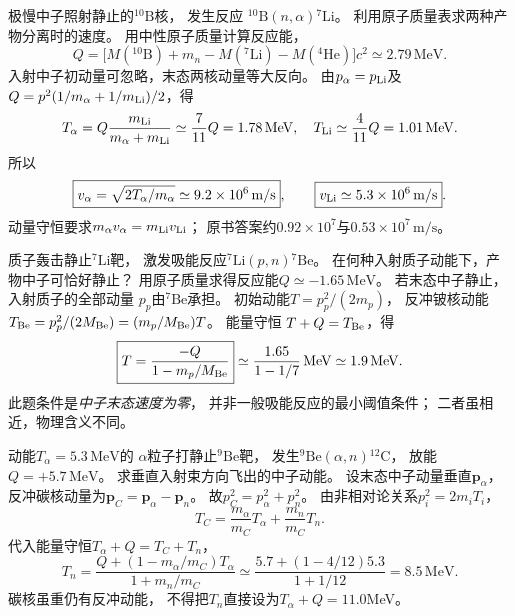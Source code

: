 极慢中子照射静止的$^{10}\mathrm B$核，
发生反应
$^{10}\mathrm B(n,\alpha){}^{7}\mathrm{Li}$。
利用原子质量表求两种产物分离时的速度。
\exsolution
用中性原子质量计算反应能，
\[
 Q=\bigl[M(^{10}\mathrm B)+m_n-
 M(^{7}\mathrm{Li})-M(^{4}\mathrm{He})\bigr]c^2
 \simeq2.79\,\mathrm{MeV}.
\]
入射中子初动量可忽略，末态两核动量等大反向。
由$p_\alpha=p_{\rm Li}$及
$Q=p^2(1/m_\alpha+1/m_{\rm Li})/2$，得
\[
 T_\alpha=Q\frac{m_{\rm Li}}{m_\alpha+m_{\rm Li}}
 \simeq\frac7{11}Q=1.78\,\mathrm{MeV},\quad
 T_{\rm Li}\simeq\frac4{11}Q=1.01\,\mathrm{MeV}.
\]
所以
\[
 \boxed{v_\alpha=\sqrt{2T_\alpha/m_\alpha}
 \simeq9.2\times10^6\,\mathrm{m/s}},\qquad
 \boxed{v_{\rm Li}\simeq5.3\times10^6\,\mathrm{m/s}}.
\]
\excheck 动量守恒要求$m_\alpha v_\alpha=m_{\rm Li}v_{\rm Li}$；
原书答案约$0.92\times10^7$与$0.53\times10^7\,\mathrm{m/s}$。

质子轰击静止$^{7}\mathrm{Li}$靶，
激发吸能反应$^{7}\mathrm{Li}(p,n){}^{7}\mathrm{Be}$。
在何种入射质子动能下，产物中子可恰好静止？
\exsolution
用原子质量求得反应能$Q\simeq-1.65\,\mathrm{MeV}$。
若末态中子静止，入射质子的全部动量
$p_p$由$^{7}\mathrm{Be}$承担。
初始动能$T=p_p^2/(2m_p)$，
反冲铍核动能$T_{\rm Be}=p_p^2/(2M_{\rm Be})
=(m_p/M_{\rm Be})T$。
能量守恒
$T+Q=T_{\rm Be}$，得
\[
 \boxed{T=\frac{-Q}{1-m_p/M_{\rm Be}}}
 \simeq\frac{1.65}{1-1/7}\,\mathrm{MeV}
 \simeq1.9\,\mathrm{MeV}.
\]
\excheck 此题条件是\emph{中子末态速度为零}，
并非一般吸能反应的最小阈值条件；
二者虽相近，物理含义不同。

动能$T_\alpha=5.3\,\mathrm{MeV}$的
$\alpha$粒子打静止$^{9}\mathrm{Be}$靶，
发生$^{9}\mathrm{Be}(\alpha,n){}^{12}\mathrm C$，
放能$Q=+5.7\,\mathrm{MeV}$。
求垂直入射束方向飞出的中子动能。
\exsolution
设末态中子动量垂直$\boldsymbol p_\alpha$，
反冲碳核动量为$\boldsymbol p_C=\boldsymbol p_\alpha-\boldsymbol p_n$。
故$p_C^2=p_\alpha^2+p_n^2$。
由非相对论关系$p_i^2=2m_iT_i$，
\[
 T_C=\frac{m_\alpha}{m_C}T_\alpha+
 \frac{m_n}{m_C}T_n.
\]
代入能量守恒$T_\alpha+Q=T_C+T_n$，
\[
 \boxed{T_n=
 \frac{Q+(1-m_\alpha/m_C)T_\alpha}
 {1+m_n/m_C}}
 \simeq\frac{5.7+(1-4/12)5.3}{1+1/12}
 =8.5\,\mathrm{MeV}.
\]
\excheck 碳核虽重仍有反冲动能，
不得把$T_n$直接设为$T_\alpha+Q=11.0$MeV。

